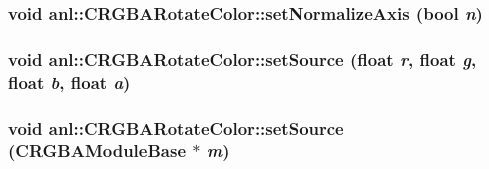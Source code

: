 \label{classanl_1_1CRGBARotateColor_a71bfd35d567570db66260cf687bc4fb0}
\hypertarget{classanl_1_1CRGBARotateColor_afa426f331d8184e9b2c6d7bdd977bec0}{
\subsubsection[{setNormalizeAxis}]{\setlength{\rightskip}{0pt plus 5cm}void anl::CRGBARotateColor::setNormalizeAxis (bool {\em n})}}
\label{classanl_1_1CRGBARotateColor_afa426f331d8184e9b2c6d7bdd977bec0}
\hypertarget{classanl_1_1CRGBARotateColor_aebd3b5df58077c276e95564501f014a1}{
\subsubsection[{setSource}]{\setlength{\rightskip}{0pt plus 5cm}void anl::CRGBARotateColor::setSource (float {\em r}, \/  float {\em g}, \/  float {\em b}, \/  float {\em a})}}
\label{classanl_1_1CRGBARotateColor_aebd3b5df58077c276e95564501f014a1}
\hypertarget{classanl_1_1CRGBARotateColor_abc4aa1c2d4878186e49abc5b6fa9c987}{
\subsubsection[{setSource}]{\setlength{\rightskip}{0pt plus 5cm}void anl::CRGBARotateColor::setSource ({\bf CRGBAModuleBase} $\ast$ {\em m})}}
\label{classanl_1_1CRGBARotateColor_abc4aa1c2d4878186e49abc5b6fa9c987}


